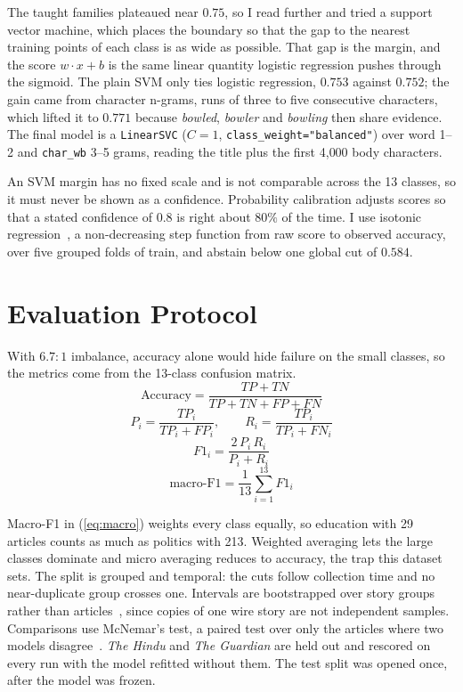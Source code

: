 \documentclass[conference]{IEEEtran}
\begin{document}
The taught families plateaued near $0.75$, so I read further and tried a support vector
machine, which places the boundary so that the gap to the nearest training points of each
class is as wide as possible. That gap is the margin, and the score $w \cdot x + b$ is
the same linear quantity logistic regression pushes through the sigmoid. The plain SVM
only ties logistic regression, $0.753$ against $0.752$; the gain came from character
n-grams, runs of three to five consecutive characters, which lifted it to $0.771$ because
\textit{bowled}, \textit{bowler} and \textit{bowling} then share evidence. The final model
is a \texttt{LinearSVC} ($C=1$, \texttt{class\_weight="balanced"}) over word 1--2 and
\texttt{char\_wb} 3--5 grams, reading the title plus the first 4{,}000 body characters.

An SVM margin has no fixed scale and is not comparable across the 13 classes, so it must
never be shown as a confidence. Probability calibration adjusts scores so that a stated
confidence of $0.8$ is right about $80\%$ of the time. I use isotonic
regression~\cite{zadrozny}, a non-decreasing step function from raw score to observed
accuracy, over five grouped folds of train, and abstain below one global cut of $0.584$.
\section{Evaluation Protocol}

With $6.7\!:\!1$ imbalance, accuracy alone would hide failure on the small classes, so the
metrics come from the 13-class confusion matrix.
\begin{equation}
\text{Accuracy} = \frac{TP + TN}{TP + TN + FP + FN}
\end{equation}
\begin{equation}
P_i = \frac{TP_i}{TP_i + FP_i}, \qquad R_i = \frac{TP_i}{TP_i + FN_i}
\end{equation}
\begin{equation}
F1_i = \frac{2 \, P_i \, R_i}{P_i + R_i}
\end{equation}
\begin{equation}
\label{eq:macro}
\text{macro-F1} = \frac{1}{13} \sum_{i=1}^{13} F1_i
\end{equation}

Macro-F1 in (\ref{eq:macro}) weights every class equally, so education with 29 articles
counts as much as politics with 213. Weighted averaging lets the large classes dominate
and micro averaging reduces to accuracy, the trap this dataset sets.
The split is grouped and temporal: the cuts follow collection time and no near-duplicate
group crosses one. Intervals are bootstrapped over story groups rather than
articles~\cite{efron}, since copies of one wire story are not independent samples.
Comparisons use McNemar's test, a paired test over only the articles where two models
disagree~\cite{dietterich}. \textit{The Hindu} and \textit{The Guardian} are held out and
rescored on every run with the model refitted without them. The test split was opened
once, after the model was frozen.
\end{document}
